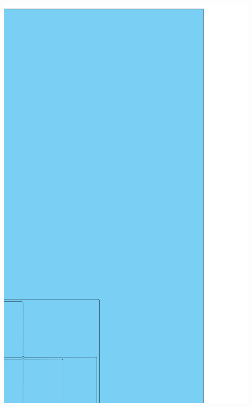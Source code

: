 \documentclass[../entwurf.tex]{subfiles}
\begin{document}
\includegraphics[scale=0.12]{../graphics/uml_diagramme/Gesamt/3.png}
\newpage
\end{document}
